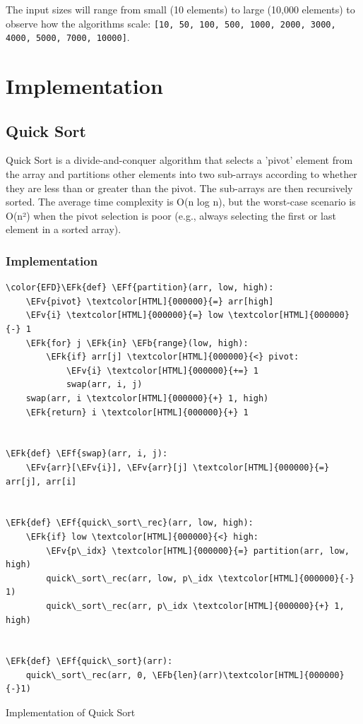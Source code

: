 \documentclass[a4paper,12pt]{article}
\newcommand{\EFk}[1]{\textcolor{EFk}{#1}} %
\newcommand{\EFb}[1]{\textcolor{EFb}{#1}} %
\newcommand{\EFf}[1]{\textcolor{EFf}{#1}} %
\newcommand{\EFv}[1]{\textcolor{EFv}{#1}} %
\begin{document}
The input sizes will range from small (10 elements) to large (10,000 elements) to observe how the algorithms scale: \texttt{[10, 50, 100, 500, 1000, 2000, 3000, 4000, 5000, 7000, 10000]}.
\section{Implementation}
\label{sec:orge2c1ff1}

\subsection{Quick Sort}
\label{sec:org54c8e08}
Quick Sort is a divide-and-conquer algorithm that selects a 'pivot' element from the array and partitions other elements into two sub-arrays according to whether they are less than or greater than the pivot. The sub-arrays are then recursively sorted. The average time complexity is O(n log n), but the worst-case scenario is O(n²) when the pivot selection is poor (e.g., always selecting the first or last element in a sorted array).
\subsubsection{Implementation}
\label{sec:orgd5297f4}
\begin{listing}[htbp]
\begin{Code}
\begin{Verbatim}
\color{EFD}\EFk{def} \EFf{partition}(arr, low, high):
    \EFv{pivot} \textcolor[HTML]{000000}{=} arr[high]
    \EFv{i} \textcolor[HTML]{000000}{=} low \textcolor[HTML]{000000}{-} 1
    \EFk{for} j \EFk{in} \EFb{range}(low, high):
        \EFk{if} arr[j] \textcolor[HTML]{000000}{<} pivot:
            \EFv{i} \textcolor[HTML]{000000}{+=} 1
            swap(arr, i, j)
    swap(arr, i \textcolor[HTML]{000000}{+} 1, high)
    \EFk{return} i \textcolor[HTML]{000000}{+} 1


\EFk{def} \EFf{swap}(arr, i, j):
    \EFv{arr}[\EFv{i}], \EFv{arr}[j] \textcolor[HTML]{000000}{=} arr[j], arr[i]


\EFk{def} \EFf{quick\_sort\_rec}(arr, low, high):
    \EFk{if} low \textcolor[HTML]{000000}{<} high:
        \EFv{p\_idx} \textcolor[HTML]{000000}{=} partition(arr, low, high)
        quick\_sort\_rec(arr, low, p\_idx \textcolor[HTML]{000000}{-} 1)
        quick\_sort\_rec(arr, p\_idx \textcolor[HTML]{000000}{+} 1, high)


\EFk{def} \EFf{quick\_sort}(arr):
    quick\_sort\_rec(arr, 0, \EFb{len}(arr)\textcolor[HTML]{000000}{-}1)
\end{Verbatim}
\end{Code}
\caption{\label{lst:org5384fef}Implementation of Quick Sort}
\end{listing}
\end{document}
